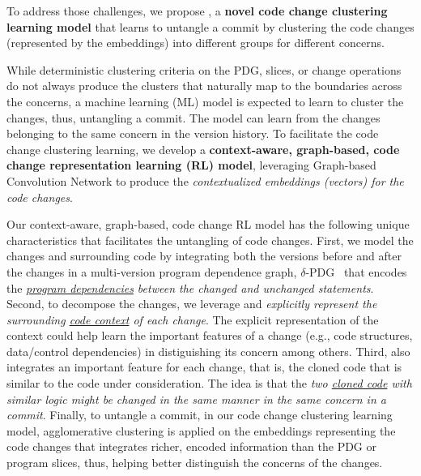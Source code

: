 


To address those challenges, we propose {\tool}, a {\bf novel code
  change clustering learning model} that learns to untangle a commit
by clustering the code changes (represented by the embeddings) into
different groups for different concerns.

While deterministic clustering criteria on the PDG, slices, or change
operations do not always produce the clusters that naturally map to
the boundaries across the concerns, a machine learning (ML) model is
expected to learn to cluster the changes, thus, untangling a
commit. The model can learn from the changes belonging to the same
concern in the version history. To facilitate the code change
clustering learning, we develop a {\bf context-aware, graph-based,
  code change representation learning (RL) model}, leveraging
Graph-based Convolution Network to produce the {\em contextualized
  embeddings (vectors) for the code changes}.

Our context-aware, graph-based, code change RL model has the following
unique characteristics that facilitates the untangling of code
changes. First, we model the changes and surrounding code by
integrating both the versions before and after the changes in a
multi-version program dependence graph,
$\delta$-PDG~\cite{flexeme-fse20} that encodes the {\em
  \underline{program dependencies} between the changed and unchanged
  statements}. Second, to decompose the changes, we leverage and {\em
  explicitly represent the surrounding \underline{code context} of
  each change}. The explicit representation of the context could help
{\tool} learn the important features of a change (e.g., code
structures, data/control dependencies) in distiguishing its concern
among others. Third, {\tool} also integrates an important feature for
each change, that is, the cloned code that is similar to the code
under consideration. The idea is that the {\em two \underline{cloned
    code} with similar logic might be changed in the same manner in
  the same concern in a commit}. Finally, to untangle a commit, in our
code change clustering learning model, agglomerative clustering is
applied on the embeddings representing the code changes that
integrates richer, encoded information than the PDG or program slices,
thus, helping better distinguish the concerns of the changes.

